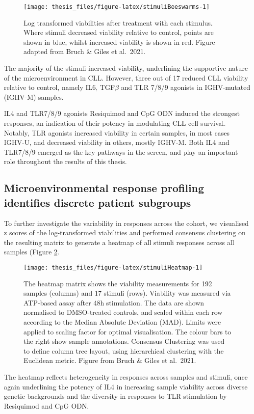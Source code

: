 \documentclass[11pt, a4paper, twosided]{book}
\begin{document}
\begin{figure}

{\centering \texttt{[image: thesis\_files/figure-latex/stimuliBeeswarms-1]} 

}

\caption{Log transformed viabilities after treatment with each stimulus. Where stimuli decreased viability relative to control, points are shown in blue, whilst increased viability is shown in red. Figure adapted from Bruch \& Giles et al.~2021.}\label{fig:stimuliBeeswarms}
\end{figure}
The majority of the stimuli increased viability, underlining the supportive nature of the microenvironment in CLL. However, three out of 17 reduced CLL viability relative to control, namely IL6, TGF\(\beta\) and TLR 7/8/9 agonists in IGHV-mutated (IGHV-M) samples.

IL4 and TLR7/8/9 agonists Resiquimod and CpG ODN induced the strongest responses, an indication of their potency in modulating CLL cell survival. Notably, TLR agonists increased viability in certain samples, in most cases IGHV-U, and decreased viability in others, mostly IGHV-M. Both IL4 and TLR7/8/9 emerged as the key pathways in the screen, and play an important role throughout the results of this thesis.

\hypertarget{clusters}{%
\subsection{Microenvironmental response profiling identifies discrete patient subgroups}\label{clusters}}

To further investigate the variability in responses across the cohort, we visualised z scores of the log-transformed viabilities and performed consensus clustering on the resulting matrix to generate a heatmap of all stimuli responses across all samples (Figure \ref{fig:stimuliHeatmap}.


\begin{figure}

{\centering \texttt{[image: thesis\_files/figure-latex/stimuliHeatmap-1]} 

}

\caption{The heatmap matrix shows the viability measurements for 192 samples (columns) and 17 stimuli (rows). Viability was measured via ATP-based assay after 48h stimulation. The data are shown normalised to DMSO-treated controls, and scaled within each row according to the Median Absolute Deviation (MAD). Limits were applied to scaling factor for optimal visualisation. The colour bars to the right show sample annotations. Consensus Clustering was used to define column tree layout, using hierarchical clustering with the Euclidean metric. Figure from Bruch \& Giles et al.~2021.}\label{fig:stimuliHeatmap}
\end{figure}
The heatmap reflects heterogeneity in responses across samples and stimuli, once again underlining the potency of IL4 in increasing sample viability across diverse genetic backgrounds and the diversity in responses to TLR stimulation by Resiquimod and CpG ODN.
\end{document}

